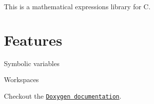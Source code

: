This is a mathematical expressions library for C.

\section*{Features}


\begin{DoxyItemize}
\item Symbolic variables
\item Workspaces
\end{DoxyItemize}

Checkout the \href{https://linux4life798.github.io/expressions/html}{\tt Doxygen documentation}. 